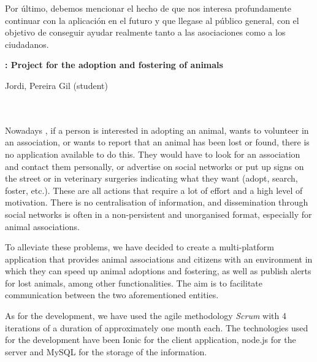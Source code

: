 Por último, debemos mencionar el hecho de que nos interesa profundamente continuar con la aplicación en el futuro y que llegase al público general, con el objetivo de conseguir ayudar realmente tanto a las asociaciones como a los ciudadanos.
\cleardoublepage


\thispagestyle{empty}


\begin{center}
{\large\bfseries \myTitle: Project for the adoption and fostering of animals}\\
\end{center}
\begin{center}
Jordi, Pereira Gil (student)\\
\end{center}

\\

\vspace{0.7cm}
\\

Nowadays , if a person is interested in adopting an animal, wants to volunteer in an association, or wants to report that an animal has been lost or found, there is no application available to do this. They would have to look for an association and contact them personally, or advertise on social networks or put up signs on the street or in veterinary surgeries indicating what they want (adopt, search, foster, etc.). These are all actions that require a lot of effort and a high level of motivation. There is no centralisation of information, and dissemination through social networks is often in a non-persistent and unorganised format, especially for animal associations.

To alleviate these problems, we have decided to create a multi-platform application that provides animal associations and citizens with an environment in which they can speed up animal adoptions and fostering, as well as publish alerts for lost animals, among other functionalities. The aim is to facilitate communication between the two aforementioned entities.

As for the development, we have used the agile methodology \textit{Scrum} with 4 iterations of a duration of approximately one month each.  The technologies used for the development have been Ionic for the client application, node.js for the server and MySQL for the storage of the information.

